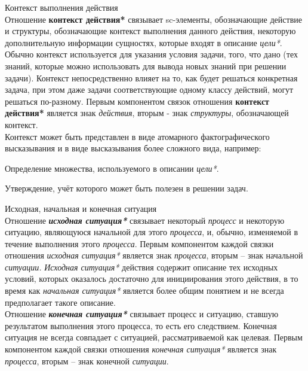 \begin{frame}{Контекст выполнения действия}
\topline
\justifying
 \\
 \bigskip
 \vspace{30}
    Отношение \textbf{контекст действия*} связывает sc-элементы, обозначающие действие и структуры, обозначающие контекст выполнения данного действия, некоторую дополнительную информации сущностях, которые входят в описание \textit{цели*}. Обычно контекст используется для указания условия задачи, того, что дано (тех знаний, которые можно использовать для вывода новых знаний при решении задачи). Контекст непосредственно влияет на то, как будет решаться конкретная задача, при этом даже задачи соответствующие одному классу действий, могут решаться по-разному.
    Первым компонентом связок отношения \textbf{контекст действия*} является знак \textit{действия}, вторым - знак \textit{структуры}, обозначающей контекст.\\
    Контекст может быть представлен в виде атомарного фактографического высказывания и в виде высказывания более сложного вида, например:
    \begin{textitemize}
        \item Определение множества, используемого в описании \textit{цели*}.
        \item Утверждение, учёт которого может быть полезен в решении задач.
    \end{textitemize}
\end{frame}

\begin{frame}{Исходная, начальная и конечная ситуация}
\topline
\justifying
 \\
 \bigskip
 \vspace{30}
Отношение \textit{\textbf{исходная ситуация*}} связывает некоторый \textit{процесс} и некоторую ситуацию, являющуюся начальной для этого \textit{процесса}, и, обычно, изменяемой в течение выполнения этого \textit{процесса}.
    Первым компонентом каждой связки отношения \textit{исходная ситуация*} является знак \textit{процесса}, вторым – знак начальной \textit{ситуации.}
    \textit{Исходная ситуация*} действия содержит описание тех исходных условий, которых оказалось достаточно для инициирования этого действия, в то время как \textit{начальная ситуация*} является более общим понятием и не всегда предполагает такоге описание.\\
    Отношение \textit{\textbf{конечная ситуация*}} связывает процесс и ситуацию, ставшую результатом выполнения этого процесса, то есть его следствием. Конечная ситуация не всегда совпадает с ситуацией, рассматриваемой как целевая.
Первым компонентом каждой связки отношения \textit{конечная ситуация*} является знак \textit{процесса}, вторым – знак конечной \textit{ситуации}.
\end{frame}